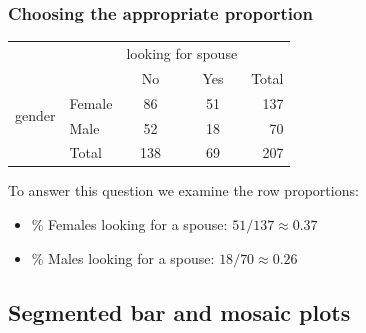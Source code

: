 \begin{frame}
\frametitle{Choosing the appropriate proportion}


\begin{center}
\begin{tabular}{l l cc r}
					& 			& \multicolumn{2}{c}{{looking for spouse}} \\
  \cline{3-4}
					&			& No	& Yes	& Total \\ 
  \cline{2-5}
\multirow{2}{*}{{gender}}& Female 		& 86 	& 51 		& 137 \\ 
  					& Male 		& 52 	& 18	 	& 70\\ 
  \cline{2-5}
  					& Total		& 138& 69	&  207 \\
  \cline{2-5}
\end{tabular}
\end{center}

\pause

To answer this question we examine the row proportions: 

\pause

\begin{itemize}

\item \% Females looking for a spouse: $51 / 137 \approx 0.37$ \\

\pause

\item \% Males looking for a spouse: $18 / 70 \approx 0.26$ \\

\end{itemize}

\end{frame}


\subsection{Segmented bar and mosaic plots}


